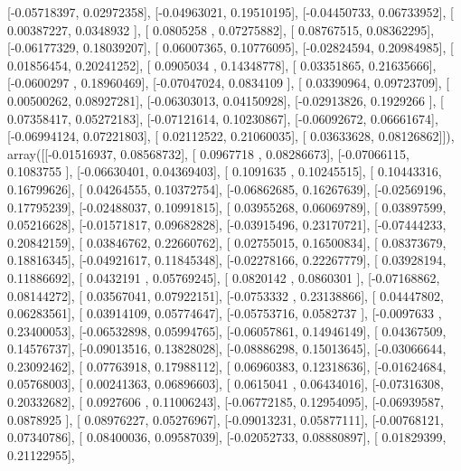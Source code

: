 \documentclass{article}
\begin{document}
       [-0.05718397,  0.02972358],
       [-0.04963021,  0.19510195],
       [-0.04450733,  0.06733952],
       [ 0.00387227,  0.0348932 ],
       [ 0.0805258 ,  0.07275882],
       [ 0.08767515,  0.08362295],
       [-0.06177329,  0.18039207],
       [ 0.06007365,  0.10776095],
       [-0.02824594,  0.20984985],
       [ 0.01856454,  0.20241252],
       [ 0.0905034 ,  0.14348778],
       [ 0.03351865,  0.21635666],
       [-0.0600297 ,  0.18960469],
       [-0.07047024,  0.0834109 ],
       [ 0.03390964,  0.09723709],
       [ 0.00500262,  0.08927281],
       [-0.06303013,  0.04150928],
       [-0.02913826,  0.1929266 ],
       [ 0.07358417,  0.05272183],
       [-0.07121614,  0.10230867],
       [-0.06092672,  0.06661674],
       [-0.06994124,  0.07221803],
       [ 0.02112522,  0.21060035],
       [ 0.03633628,  0.08126862]]), array([[-0.01516937,  0.08568732],
       [ 0.0967718 ,  0.08286673],
       [-0.07066115,  0.1083755 ],
       [-0.06630401,  0.04369403],
       [ 0.1091635 ,  0.10245515],
       [ 0.10443316,  0.16799626],
       [ 0.04264555,  0.10372754],
       [-0.06862685,  0.16267639],
       [-0.02569196,  0.17795239],
       [-0.02488037,  0.10991815],
       [ 0.03955268,  0.06069789],
       [ 0.03897599,  0.05216628],
       [-0.01571817,  0.09682828],
       [-0.03915496,  0.23170721],
       [-0.07444233,  0.20842159],
       [ 0.03846762,  0.22660762],
       [ 0.02755015,  0.16500834],
       [ 0.08373679,  0.18816345],
       [-0.04921617,  0.11845348],
       [-0.02278166,  0.22267779],
       [ 0.03928194,  0.11886692],
       [ 0.0432191 ,  0.05769245],
       [ 0.0820142 ,  0.0860301 ],
       [-0.07168862,  0.08144272],
       [ 0.03567041,  0.07922151],
       [-0.0753332 ,  0.23138866],
       [ 0.04447802,  0.06283561],
       [ 0.03914109,  0.05774647],
       [-0.05753716,  0.0582737 ],
       [-0.0097633 ,  0.23400053],
       [-0.06532898,  0.05994765],
       [-0.06057861,  0.14946149],
       [ 0.04367509,  0.14576737],
       [-0.09013516,  0.13828028],
       [-0.08886298,  0.15013645],
       [-0.03066644,  0.23092462],
       [ 0.07763918,  0.17988112],
       [ 0.06960383,  0.12318636],
       [-0.01624684,  0.05768003],
       [ 0.00241363,  0.06896603],
       [ 0.0615041 ,  0.06434016],
       [-0.07316308,  0.20332682],
       [ 0.0927606 ,  0.11006243],
       [-0.06772185,  0.12954095],
       [-0.06939587,  0.0878925 ],
       [ 0.08976227,  0.05276967],
       [-0.09013231,  0.05877111],
       [-0.00768121,  0.07340786],
       [ 0.08400036,  0.09587039],
       [-0.02052733,  0.08880897],
       [ 0.01829399,  0.21122955],
\end{document}
